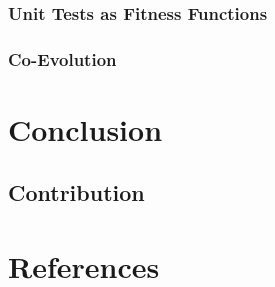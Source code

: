 \documentclass{l4proj}
\begin{document}
\subsection{Unit Tests as Fitness Functions}
\subsection{Co-Evolution}

\chapter{Conclusion}


\section{Contribution}

\chapter{References}
\end{document}
